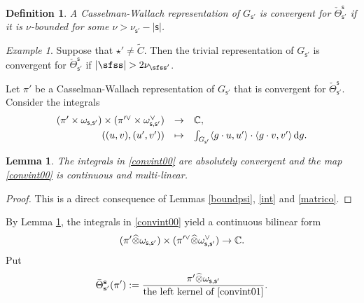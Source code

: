 \documentclass[11pt,a4paper]{amsart}
\def\abs#1{\left|{#1}\right|}
\newcommand{\od}{\operatorname{d}}
\newcommand{\la}{\langle}
\newcommand{\ra}{\rangle}
\newcommand{\be}{\begin {equation}}
\newcommand{\ee}{\end {equation}}
\numberwithin{equation}{section}
\newtheorem{lem}[thm]{Lemma}
\newtheorem{defn}[thm]{Definition}
\theoremstyle{remark}
\newtheorem*{Example}{Example}
\def\Thetab{\bar{\Theta}}
\begin{document}
 \begin{defn}\label{defn:CRcov}
A Casselman-Wallach representation of $G_{\mathsf s'}$ is convergent for $\check \Theta_{\mathsf s'}^{\mathsf s}$
if it is $\nu$-bounded for some $\nu>\nu_{\mathsf s'}-\abs{\mathsf s}$.
\end{defn}


\begin{Example}
Suppose that $\star'\neq \widetilde C$. Then the trivial representation of $G_{\mathsf s'}$ is convergent for $\check \Theta_{\mathsf s'}^{\mathsf s}$ if $\abs{\sfss}>2\nu_{\sfss'}$.

\end{Example}
Let $\pi'$ be a  Casselman-Wallach representation of $G_{\mathsf s'}$ that is convergent for $\check \Theta_{\mathsf s'}^{\mathsf s}$.
Consider the integrals
\be\label{convint00}
\begin{array}{rcl}
 (\pi' \times \omega_{\mathsf s, \mathsf s'})\times (\pi'^\vee \times \omega_{\mathsf s, \mathsf s'}^\vee )&\rightarrow &\C, \smallskip \\
   ((u,v),(u',v')) &\mapsto &\int_{G_{\mathsf s'}} \la g\cdot u, u'\ra\cdot \la g\cdot v, v'\ra \od\! g.
   \end{array}
 \ee

\begin{lem}\label{lemconv}
The integrals in \eqref{convint00} are absolutely convergent and the map \eqref{convint00} is   continuous and multi-linear.
\end{lem}
\begin{proof}
This is a direct consequence of Lemmas \ref{boundpsi}, \ref{int} and \ref{matrico}.
\end{proof}

By Lemma \ref{lemconv}, the integrals in \eqref{convint00} yield a continuous bilinear form
\be\label{convint01}
 (\pi' \widehat \otimes \omega_{\mathsf s, \mathsf s'})\times (\pi'^\vee \widehat \otimes \omega_{\mathsf s, \mathsf s'}^\vee )\rightarrow \C.
 \ee
Put
\begin{equation}\label{thetab0}
  \Thetab_{\mathbf s'}^{\mathbf s}(\pi'):=\frac{\pi' \widehat \otimes \omega_{\mathsf s, \mathsf s'}}{\textrm{the left kernel of \eqref{convint01}}}.
\end{equation}
\end{document}
